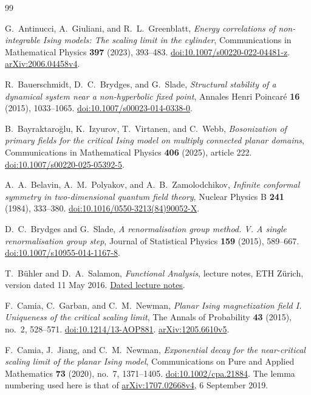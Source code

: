 \begingroup
\small
\begin{thebibliography}{99}

G.~Antinucci, A.~Giuliani, and R.~L.~Greenblatt,
\emph{Energy correlations of non-integrable Ising models: The scaling
limit in the cylinder},
Communications in Mathematical Physics \textbf{397} (2023), 393--483.
\href{https://doi.org/10.1007/s00220-022-04481-z}{doi:10.1007/s00220-022-04481-z}.
\href{https://arxiv.org/abs/2006.04458v4}{arXiv:2006.04458v4}.

R.~Bauerschmidt, D.~C.~Brydges, and G.~Slade,
\emph{Structural stability of a dynamical system near a non-hyperbolic fixed point},
Annales Henri Poincar\'e \textbf{16} (2015), 1033--1065.
\href{https://doi.org/10.1007/s00023-014-0338-0}{doi:10.1007/s00023-014-0338-0}.

B.~Bayraktaro\u{g}lu, K.~Izyurov, T.~Virtanen, and C.~Webb,
\emph{Bosonization of primary fields for the critical Ising model on multiply connected planar domains},
Communications in Mathematical Physics \textbf{406} (2025), article 222.
\href{https://doi.org/10.1007/s00220-025-05392-5}{doi:10.1007/s00220-025-05392-5}.

A.~A.~Belavin, A.~M.~Polyakov, and A.~B.~Zamolodchikov,
\emph{Infinite conformal symmetry in two-dimensional quantum field theory},
Nuclear Physics B \textbf{241} (1984), 333--380.
\href{https://doi.org/10.1016/0550-3213(84)90052-X}{doi:10.1016/0550-3213(84)90052-X}.

D.~C.~Brydges and G.~Slade,
\emph{A renormalisation group method. V. A single renormalisation group step},
Journal of Statistical Physics \textbf{159} (2015), 589--667.
\href{https://doi.org/10.1007/s10955-014-1167-8}{doi:10.1007/s10955-014-1167-8}.

T.~B\"uhler and D.~A.~Salamon,
\emph{Functional Analysis}, lecture notes, ETH Z\"urich,
version dated 11 May 2016.
\href{https://math.jhu.edu/~js/Math637/eth.functionalanalysis.pdf}{Dated lecture notes}.

F.~Camia, C.~Garban, and C.~M.~Newman,
\emph{Planar Ising magnetization field I. Uniqueness of the critical
scaling limit},
The Annals of Probability \textbf{43} (2015), no.~2, 528--571.
\href{https://doi.org/10.1214/13-AOP881}{doi:10.1214/13-AOP881}.
\href{https://arxiv.org/abs/1205.6610v5}{arXiv:1205.6610v5}.

F.~Camia, J.~Jiang, and C.~M.~Newman,
\emph{Exponential decay for the near-critical scaling limit of the
planar Ising model},
Communications on Pure and Applied Mathematics \textbf{73} (2020),
no.~7, 1371--1405.
\href{https://doi.org/10.1002/cpa.21884}{doi:10.1002/cpa.21884}.
The lemma numbering used here is that of
\href{https://arxiv.org/abs/1707.02668v4}{arXiv:1707.02668v4},
6 September 2019.


\end{thebibliography}
